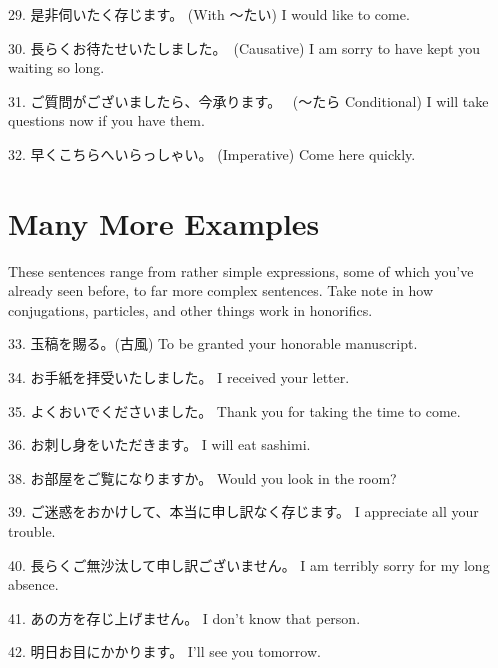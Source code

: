 \par{29. 是非伺いたく存じます。 (With ～たい) \hfill\break
I would like to come. }

\par{30. 長らくお待たせいたしました。 (Causative) \hfill\break
I am sorry to have kept you waiting so long. }

\par{31. ご質問がございましたら、今承ります。  (～たら Conditional) \hfill\break
I will take questions now if you have them. }

\par{32. 早くこちらへいらっしゃい。 (Imperative) \hfill\break
Come here quickly. }
      
\section{Many More Examples}
 
\par{ These sentences range from rather simple expressions, some of which you've already seen before, to far more complex sentences. Take note in how conjugations, particles, and other things work in honorifics. }

\par{33. 玉稿を賜る。(古風) \hfill\break
To be granted your honorable manuscript. }

\par{34. お手紙を拝受いたしました。 \hfill\break
I received your letter. }

\par{35. よくおいでくださいました。 \hfill\break
Thank you for taking the time to come. }

\par{36. お刺し身をいただきます。 \hfill\break
I will eat sashimi. }

\par{38. お部屋をご覧になりますか。 \hfill\break
Would you look in the room? }

\par{39. ご迷惑をおかけして、本当に申し訳なく存じます。 \hfill\break
I appreciate all your trouble. }

\par{40. 長らくご無沙汰して申し訳ございません。 \hfill\break
I am terribly sorry for my long absence. }

\par{41. あの方を存じ上げません。 \hfill\break
I don't know that person. }

\par{42. 明日お目にかかります。 \hfill\break
I'll see you tomorrow. }


